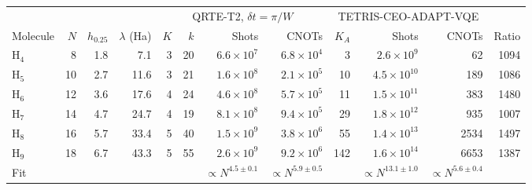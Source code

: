 \begin{tabular}{lrrrrrrrrrrr}
\toprule
 & & & & \multicolumn{4}{c}{QRTE-T2, $\delta t=\pi/W$} & \multicolumn{3}{c}{TETRIS-CEO-ADAPT-VQE} & \\
\cmidrule(lr){5-8}\cmidrule(lr){9-11}
Molecule & $N$ & $h_{0.25}$ & $\lambda$ (Ha) & $K$ & $k$ & Shots & CNOTs & $K_A$ & Shots & CNOTs & Ratio \\
\midrule
H$_4$ & 8 & 1.8 & 7.1 & 3 & 20 & $6.6\times10^{7}$ & $6.8\times10^{4}$ & 3 & $2.6\times10^{9}$ & 62 & 1094 \\
H$_5$ & 10 & 2.7 & 11.6 & 3 & 21 & $1.6\times10^{8}$ & $2.1\times10^{5}$ & 10 & $4.5\times10^{10}$ & 189 & 1086 \\
H$_6$ & 12 & 3.6 & 17.6 & 4 & 24 & $4.6\times10^{8}$ & $5.7\times10^{5}$ & 11 & $1.5\times10^{11}$ & 383 & 1480 \\
H$_7$ & 14 & 4.7 & 24.7 & 4 & 19 & $8.1\times10^{8}$ & $9.4\times10^{5}$ & 29 & $1.8\times10^{12}$ & 935 & 1007 \\
H$_8$ & 16 & 5.7 & 33.4 & 5 & 40 & $1.5\times10^{9}$ & $3.8\times10^{6}$ & 55 & $1.4\times10^{13}$ & 2534 & 1497 \\
H$_9$ & 18 & 6.7 & 43.3 & 5 & 55 & $2.6\times10^{9}$ & $9.2\times10^{6}$ & 142 & $1.6\times10^{14}$ & 6653 & 1387 \\
\midrule
Fit & & & & & & $\propto N^{4.5\pm0.1}$ & $\propto N^{5.9\pm0.5}$ & & $\propto N^{13.1\pm1.0}$ & $\propto N^{5.6\pm0.4}$ & \\
\bottomrule
\end{tabular}
